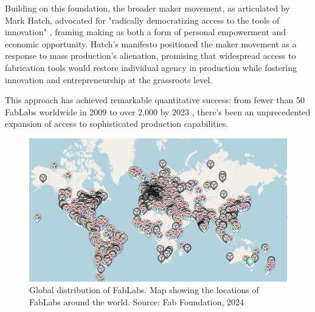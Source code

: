 Building on this foundation, the broader maker movement, as articulated by Mark Hatch, advocated for "radically democratizing access to the tools of innovation" \citep{hatch2013}, framing making as both a form of personal empowerment and economic opportunity. Hatch's manifesto positioned the maker movement as a response to mass production's alienation, promising that widespread access to fabrication tools would restore individual agency in production while fostering innovation and entrepreneurship at the grassroots level.

\vspace{0.5cm}

This approach has achieved remarkable quantitative success: from fewer than 50 FabLabs worldwide in 2009 to over 2,000 by 2023 \citep{fabfoundation2024}, there's been an unprecedented expansion of access to sophisticated production capabilities.

\begin{figure}[h]
\centering
\includegraphics[width=1\textwidth]{figures/chapter2/fablabsmap.png}
\caption{Global distribution of FabLabs. Map showing the locations of FabLabs around the world. Source: Fab Foundation, 2024}
\label{fig:fablabs_map}
\end{figure}

